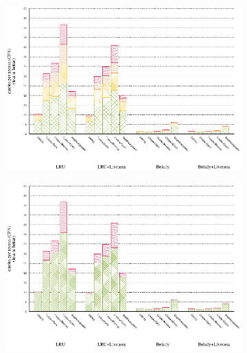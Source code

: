 \documentclass[onecolumn, openright, master, english, signatures]{dbrgrptt}
\begin{document}
\begin{figure}[!ht]
  \begin{subfigure}[b]{0.5\textwidth}%
    \includegraphics[width=\textwidth]{figs/plots/perf-450-soplex.eps}
  \end{subfigure}%
    \begin{subfigure}[b]{0.5\textwidth}%
    \includegraphics[width=\textwidth]{figs/plots/perf-misses-450-soplex.eps}
  \end{subfigure}%
  \caption{}
  \label{fig:todo}
\end{figure}
\end{document}
